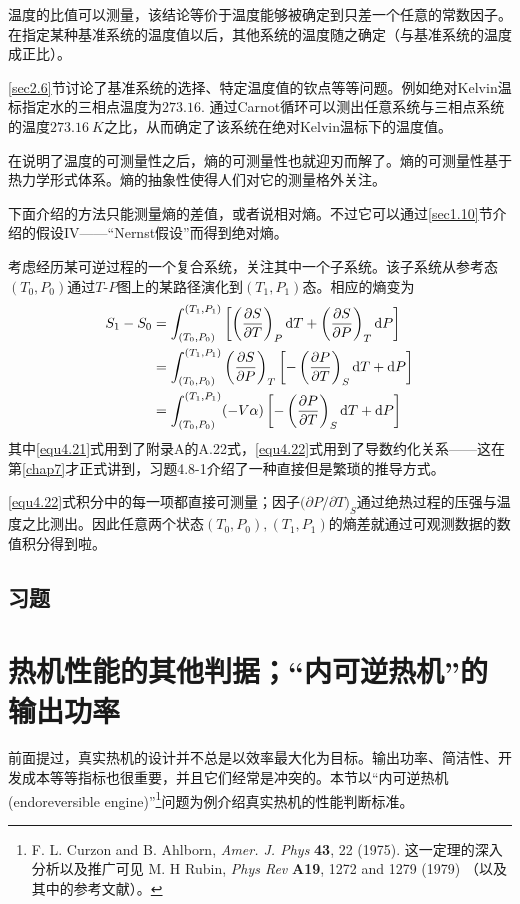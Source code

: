 温度的比值可以测量，该结论等价于温度能够被确定到只差一个任意的常数因子。在指定某种基准系统的温度值以后，其他系统的温度随之确定（与基准系统的温度成正比）。

\ref{sec2.6}节讨论了基准系统的选择、特定温度值的钦点等等问题。例如绝对Kelvin温标指定水的三相点温度为$273.16$. 通过Carnot循环可以测出任意系统与三相点系统的温度$\SI{273.16}{K}$之比，从而确定了该系统在绝对Kelvin温标下的温度值。

在说明了温度的可测量性之后，熵的可测量性也就迎刃而解了。熵的可测量性基于热力学形式体系。熵的抽象性使得人们对它的测量格外关注。

下面介绍的方法只能测量熵的差值，或者说相对熵。不过它可以通过\ref{sec1.10}节介绍的假设IV——“Nernst假设”而得到绝对熵。

考虑经历某可逆过程的一个复合系统，关注其中一个子系统。该子系统从参考态$(T_0, P_0)$通过$T\text{-}P$图上的某路径演化到$(T_1, P_1)$态。相应的熵变为
\begin{align}
	S_1 - S_0 &= \int_{ (T_0, P_0) }^{ (T_1, P_1) } \left[ \left( \frac{\partial S}{\partial T} \right)_P \mathrm{d} T + \left( \frac{\partial S}{\partial P} \right)_T \mathrm{d} P \right] \label{equ4.20} \\
	&= \int_{ (T_0, P_0) }^{ (T_1, P_1) } \left( \frac{\partial S}{\partial P} \right)_T \left[ -\left( \frac{\partial P}{\partial T} \right)_S \mathrm{d} T + \mathrm{d} P \right] \label{equ4.21} \\
	&= \int_{ (T_0, P_0) }^{ (T_1, P_1) } (-V\alpha) \left[ -\left( \frac{\partial P}{\partial T} \right)_S \mathrm{d} T + \mathrm{d} P \right] \label{equ4.22}
\end{align}
其中\eqref{equ4.21}式用到了附录A的A.22式，\eqref{equ4.22}式用到了导数约化关系——这在第\ref{chap7}才正式讲到，习题4.8-1介绍了一种直接但是繁琐的推导方式。

\eqref{equ4.22}式积分中的每一项都直接可测量；因子$\big( \partial P / \partial T \big)_S$通过绝热过程的压强与温度之比测出。因此任意两个状态$(T_0, P_0), (T_1, P_1)$的熵差就通过可观测数据的数值积分得到啦。

\subsection*{习题}

\section{热机性能的其他判据；“内可逆热机”的输出功率}
\label{sec4.9}
前面提过，真实热机的设计并不总是以效率最大化为目标。输出功率、简洁性、开发成本等等指标也很重要，并且它们经常是冲突的。本节以“内可逆热机(endoreversible engine)”\footnote{F. L. Curzon and B. Ahlborn,  {\it Amer. J. Phys} {\bf 43}, 22 (1975). 这一定理的深入分析以及推广可见 M. H Rubin, {\it Phys Rev}  {\bf A19},  1272 and 1279 (1979)  （以及其中的参考文献）。}问题为例介绍真实热机的性能判断标准。

